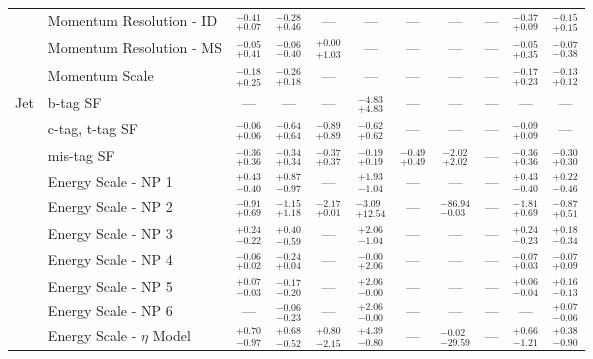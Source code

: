 \begin{tabular}{|cl||ccccccc|c||c|}
\cline{2-11}
&Momentum Resolution - ID &  $^{-0.41}_{+0.07}$  &  $^{-0.28}_{+0.46}$  & --- & --- & --- & --- & --- &  $^{-0.37}_{+0.09}$  &  $^{-0.15}_{+0.15}$ \\ 
\cline{2-11}
&Momentum Resolution - MS &  $^{-0.05}_{+0.41}$  &  $^{-0.06}_{-0.40}$  &  $^{+0.00}_{+1.03}$  & --- & --- & --- & --- &  $^{-0.05}_{+0.35}$  &  $^{-0.07}_{-0.38}$ \\ 
\cline{2-11}
&Momentum Scale &  $^{-0.18}_{+0.25}$  &  $^{-0.26}_{+0.18}$  & --- & --- & --- & --- & --- &  $^{-0.17}_{+0.23}$  &  $^{-0.13}_{+0.12}$ \\ 
\hline
\multirow{22}{*}{Jet}
&b-tag SF & --- & --- & --- &  $^{-4.83}_{+4.83}$  & --- & --- & --- & --- & ---\\ 
\cline{2-11}
&c-tag, t-tag SF &  $^{-0.06}_{+0.06}$  &  $^{-0.64}_{+0.64}$  &  $^{-0.89}_{+0.89}$  &  $^{-0.62}_{+0.62}$  & --- & --- & --- &  $^{-0.09}_{+0.09}$  & ---\\ 
\cline{2-11}
&mis-tag SF &  $^{-0.36}_{+0.36}$  &  $^{-0.34}_{+0.34}$  &  $^{-0.37}_{+0.37}$  &  $^{-0.19}_{+0.19}$  &  $^{-0.49}_{+0.49}$  &  $^{-2.02}_{+2.02}$  & --- &  $^{-0.36}_{+0.36}$  &  $^{-0.30}_{+0.30}$ \\ 
\cline{2-11}
&Energy Scale - NP 1 &  $^{+0.43}_{-0.40}$  &  $^{+0.87}_{-0.97}$  & --- &  $^{+1.93}_{-1.04}$  & --- & --- & --- &  $^{+0.43}_{-0.40}$  &  $^{+0.22}_{-0.46}$ \\ 
\cline{2-11}
&Energy Scale - NP 2 &  $^{-0.91}_{+0.69}$  &  $^{-1.15}_{+1.18}$  &  $^{-2.17}_{+0.01}$  &  $^{-3.09}_{+12.54}$  & --- &  $^{-86.94}_{-0.03}$  & --- &  $^{-1.81}_{+0.69}$  &  $^{-0.87}_{+0.51}$ \\ 
\cline{2-11}
&Energy Scale - NP 3 &  $^{+0.24}_{-0.22}$  &  $^{+0.40}_{-0.59}$  & --- &  $^{+2.06}_{-1.04}$  & --- & --- & --- &  $^{+0.24}_{-0.23}$  &  $^{+0.18}_{-0.34}$ \\ 
\cline{2-11}
&Energy Scale - NP 4 &  $^{-0.06}_{+0.02}$  &  $^{-0.24}_{+0.04}$  & --- &  $^{-0.00}_{+2.06}$  & --- & --- & --- &  $^{-0.07}_{+0.03}$  &  $^{-0.07}_{+0.09}$ \\ 
\cline{2-11}
&Energy Scale - NP 5 &  $^{+0.07}_{-0.03}$  &  $^{-0.17}_{-0.20}$  & --- &  $^{+2.06}_{-0.00}$  & --- & --- & --- &  $^{+0.06}_{-0.04}$  &  $^{+0.16}_{-0.13}$ \\ 
\cline{2-11}
&Energy Scale - NP 6 & --- &  $^{-0.06}_{-0.23}$  & --- &  $^{+2.06}_{-0.00}$  & --- & --- & --- & --- &  $^{+0.07}_{-0.06}$ \\ 
\cline{2-11}
&Energy Scale - $\eta$ Model &  $^{+0.70}_{-0.97}$  &  $^{+0.68}_{-0.52}$  &  $^{+0.80}_{-2.15}$  &  $^{+4.39}_{-0.80}$  & --- &  $^{-0.02}_{-29.59}$  & --- &  $^{+0.66}_{-1.21}$  &  $^{+0.38}_{-0.90}$ \\ 

\end{tabular}
